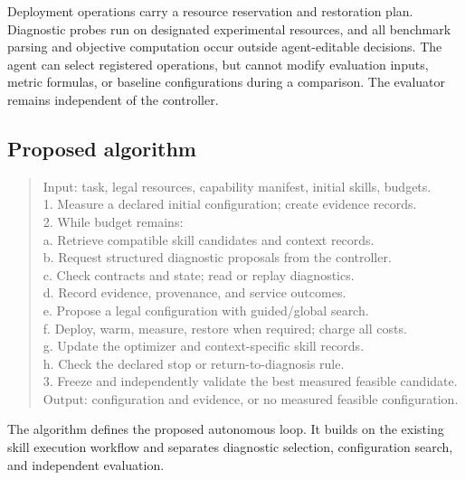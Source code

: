 \documentclass[11pt,a4paper]{article}
\begin{document}
Deployment operations carry a resource reservation and restoration plan. Diagnostic probes run on designated experimental resources, and all benchmark parsing and objective computation occur outside agent-editable decisions. The agent can select registered operations, but cannot modify evaluation inputs, metric formulas, or baseline configurations during a comparison. The evaluator remains independent of the controller.

\subsection{Proposed algorithm}
\begin{quote}\small\ttfamily
Input: task, legal resources, capability manifest, initial skills, budgets.\\
1. Measure a declared initial configuration; create evidence records.\\
2. While budget remains:\\
\hspace*{1em}a. Retrieve compatible skill candidates and context records.\\
\hspace*{1em}b. Request structured diagnostic proposals from the controller.\\
\hspace*{1em}c. Check contracts and state; read or replay diagnostics.\\
\hspace*{1em}d. Record evidence, provenance, and service outcomes.\\
\hspace*{1em}e. Propose a legal configuration with guided/global search.\\
\hspace*{1em}f. Deploy, warm, measure, restore when required; charge all costs.\\
\hspace*{1em}g. Update the optimizer and context-specific skill records.\\
\hspace*{1em}h. Check the declared stop or return-to-diagnosis rule.\\
3. Freeze and independently validate the best measured feasible candidate.\\
Output: configuration and evidence, or no measured feasible configuration.
\end{quote}
The algorithm defines the proposed autonomous loop. It builds on the existing skill execution workflow and separates diagnostic selection, configuration search, and independent evaluation.
\end{document}
